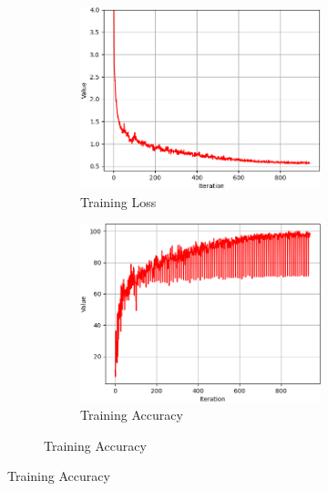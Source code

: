 \begin{figure}[ht]
    \centering
    \begin{subfigure}{\textwidth}
        \centering
        \begin{subfigure}{0.32\textwidth}
            \includegraphics[width=\linewidth]{Images/training/Global_7_train_loss.png}
            \caption{Training Loss}
            \label{Global_7_train_loss}
        \end{subfigure}
        \begin{subfigure}{0.32\textwidth}
            \includegraphics[width=\linewidth]{Images/training/Global_7_train_acc.png}
            \caption{Training Accuracy}
            \label{Global_7_train_acc}
        \end{subfigure}

\end{subfigure}
\end{figure}

